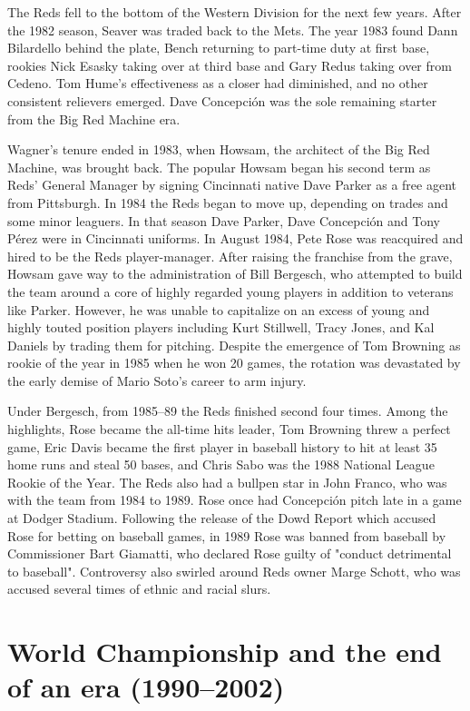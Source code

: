 The Reds fell to the bottom of the Western Division for the next few
years. After the 1982 season, Seaver was traded back to the Mets. The
year 1983 found Dann Bilardello behind the plate, Bench returning to
part-time duty at first base, rookies Nick Esasky taking over at third
base and Gary Redus taking over from Cedeno. Tom Hume's effectiveness as
a closer had diminished, and no other consistent relievers emerged. Dave
Concepción was the sole remaining starter from the Big Red Machine era.

Wagner's tenure ended in 1983, when Howsam, the architect of the Big Red
Machine, was brought back. The popular Howsam began his second term as
Reds' General Manager by signing Cincinnati native Dave Parker as a free
agent from Pittsburgh. In 1984 the Reds began to move up, depending on
trades and some minor leaguers. In that season Dave Parker, Dave
Concepción and Tony Pérez were in Cincinnati uniforms. In August 1984,
Pete Rose was reacquired and hired to be the Reds player-manager. After
raising the franchise from the grave, Howsam gave way to the
administration of Bill Bergesch, who attempted to build the team around
a core of highly regarded young players in addition to veterans like
Parker. However, he was unable to capitalize on an excess of young and
highly touted position players including Kurt Stillwell, Tracy Jones,
and Kal Daniels by trading them for pitching. Despite the emergence of
Tom Browning as rookie of the year in 1985 when he won 20 games, the
rotation was devastated by the early demise of Mario Soto's career to
arm injury.

Under Bergesch, from 1985--89 the Reds finished second four times. Among
the highlights, Rose became the all-time hits leader, Tom Browning threw
a perfect game, Eric Davis became the first player in baseball history
to hit at least 35 home runs and steal 50 bases, and Chris Sabo was the
1988 National League Rookie of the Year. The Reds also had a bullpen
star in John Franco, who was with the team from 1984 to 1989. Rose once
had Concepción pitch late in a game at Dodger Stadium. Following the
release of the Dowd Report which accused Rose for betting on baseball
games, in 1989 Rose was banned from baseball by Commissioner Bart
Giamatti, who declared Rose guilty of "conduct detrimental to baseball".
Controversy also swirled around Reds owner Marge Schott, who was accused
several times of ethnic and racial slurs.

\section{World Championship and the end of an era
(1990--2002)}\label{world-championship-and-the-end-of-an-era-19902002}

